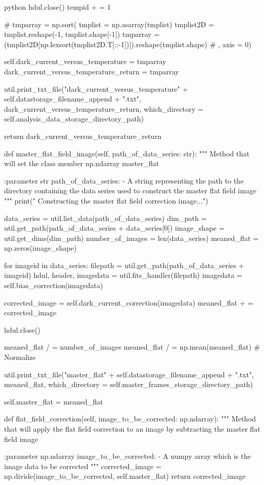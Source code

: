 \documentclass[../main.tex]{subfiles}
\begin{document}
\begin{mintedbox}{python}
hdul.close()
tempid + =  1

# tmparray  =  np.sort(
tmplist  =  np.asarray(tmplist)
tmplist2D  =  tmplist.reshape(-1, tmplist.shape[-1])
tmparray  =  (tmplist2D[np.lexsort(tmplist2D.T[::-1])]).reshape(tmplist.shape)
#       , axis = 0)

self.dark_current_versus_temperature  =  tmparray
dark_current_versus_temperature_return  =  tmparray

util.print_txt_file("dark_current_versus_temperature" + self.datastorage_filename_append + ".txt",
dark_current_versus_temperature_return,
which_directory = self.analysis_data_storage_directory_path)

return dark_current_versus_temperature_return

def master_flat_field_image(self, path_of_data_series: str):
"""
Method that will set the class member np.ndarray master_flat

:parameter str path_of_data_series:
- A string representing the path to the directory
containing the data series used to construct the
master flat field image
"""
print(" Constructing the master flat field correction image...")

data_series  =  util.list_data(path_of_data_series)
dim_path  =  util.get_path(path_of_data_series + data_series[0])
image_shape  =  util.get_dims(dim_path)
number_of_images  =  len(data_series)
meaned_flat  =  np.zeros(image_shape)

for imageid in data_series:
filepath  =  util.get_path(path_of_data_series + imageid)
hdul, header, imagedata  =  util.fits_handler(filepath)
imagedata  =  self.bias_correction(imagedata)

corrected_image  =  self.dark_current_correction(imagedata)
meaned_flat + =  corrected_image

hdul.close()

meaned_flat / =  number_of_images
meaned_flat / =  np.mean(meaned_flat)  # Normalize

util.print_txt_file("master_flat" + self.datastorage_filename_append + ".txt", meaned_flat,
which_directory = self.master_frames_storage_directory_path)

self.master_flat  =  meaned_flat

def flat_field_correction(self, image_to_be_corrected: np.ndarray):
"""
Method that will apply the flat field correction to an image
by subtracting the master flat field image

:parameter np.ndarray image_to_be_corrected:
- A numpy array which is the image data to be corrected
"""
corrected_image  =  np.divide(image_to_be_corrected, self.master_flat)
return corrected_image


\end{mintedbox}
\end{document}
